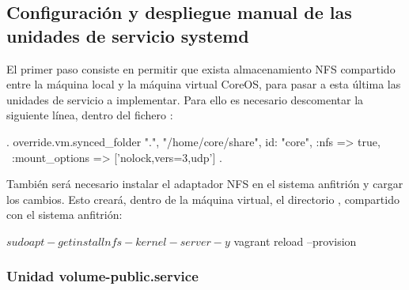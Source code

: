 \begin{codelisting}
\end{codelisting}

\subsection{Configuración y despliegue manual de las unidades de servicio systemd}

El primer paso consiste en permitir que exista almacenamiento NFS compartido entre la máquina local y la máquina virtual CoreOS, para pasar a esta última las unidades de servicio a implementar. Para ello es necesario descomentar la siguiente línea, dentro del fichero :

\begin{codelisting}
\label{code:vagrantfile2}
\begin{code}
.
override.vm.synced_folder ".", "/home/core/share", id: "core", :nfs => true, \
:mount_options => ['nolock,vers=3,udp']
.
\end{code}
\end{codelisting}

También será necesario instalar el adaptador NFS en el sistema anfitrión y cargar los cambios. Esto creará, dentro de la máquina virtual, el directorio , compartido con el sistema anfitrión:

\begin{code}
$ sudo apt-get install nfs-kernel-server -y
$ vagrant reload --provision
\end{code}

\subsubsection{Unidad volume-public.service}

